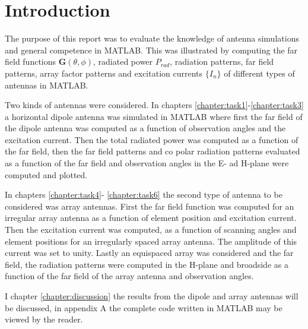 \chapter*{Introduction}
\label{chapter:introduction}

The purpose of this report was to evaluate the knowledge of antenna simulations and general competence in MATLAB.  This was illustrated by computing the far field functions $\mathbf{G}(\theta, \phi)$, radiated power $P_{rad}$, radiation patterns, far field patterns, array factor patterns and excitation currents $\{I_n\}$ of different types of antennas in MATLAB. 

Two kinds of antennas were considered. In chapters \ref{chapter:task1}-\ref{chapter:task3} a horizontal dipole antenna was simulated in MATLAB where first the far field of the dipole antenna was computed as a function of observation angles and the excitation current. Then the total radiated power was computed as a function of the far field, then the far field patterns  and co polar radiation patterns evaluated as a function of the far field and observation angles in the E- ad H-plane were computed and plotted.

 In chapters \ref{chapter:task4}- \ref{chapter:task6} the second type of antenna to be considered was array antennas. First the far field function was computed for an irregular array antenna as a function of element position and excitation current. Then the excitation current was computed, as a function of scanning angles and element positions for an irregularly spaced array antenna. The amplitude of this current was set to unity. Lastly an equispaced array was considered and the far field, the radiation patterns were computed in the H-plane and broadside as a function of the far field of the array antenna and observation angles. 
 
 I chapter \ref{chapter:discussion} the results from the dipole and array antennas will be discussed, in appendix A the complete code written in MATLAB may be viewed by the reader.  